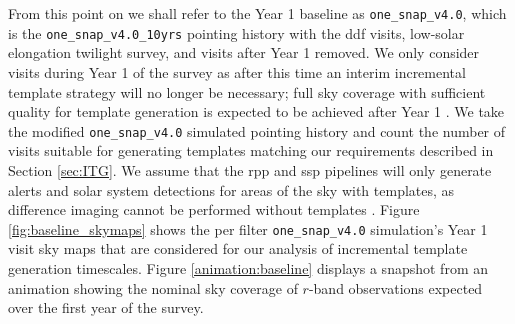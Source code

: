 \documentclass[preprintm,linenumbers]{aastex631}
\newcommand{\baseline}{\texttt{one\_snap\_v4.0}\xspace}
\newcommand{\baselinefull}{\texttt{one\_snap\_v4.0\_10yrs}\xspace}
\begin{document}
    From this point on we shall refer to the Year 1 baseline as \baseline, which is the \baselinefull pointing history with the \gls*{ddf} visits,  low-solar elongation twilight survey, and visits after Year 1 removed. We only consider visits during Year 1 of the survey as after this time an interim incremental template strategy will no longer be necessary; full sky coverage with sufficient quality for template generation is expected to be achieved after Year 1 \citep{RTN-011}.  We take the modified  \baseline simulated pointing history and count the number of visits suitable for generating templates matching our requirements described in Section \ref{sec:ITG}.  We assume that the \gls*{rpp} and \gls*{ssp} pipelines will only generate alerts and solar system detections for areas of the sky with templates, as difference imaging cannot be performed without templates \citep{DMTN-107}. 
 Figure \ref{fig:baseline_skymaps} shows the per filter \baseline simulation's Year 1 visit sky maps that are considered for our analysis of incremental template generation timescales. 
 Figure \ref{animation:baseline} displays a snapshot from an animation showing the nominal sky coverage of $r$-band observations expected over the first year of the survey.
\end{document}
